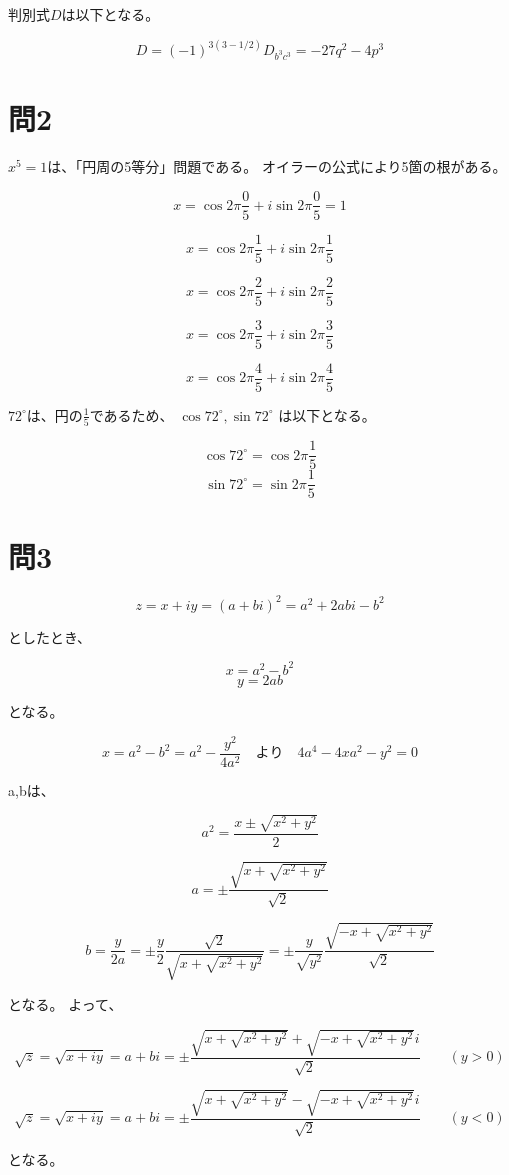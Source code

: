 \documentclass{jsarticle}
\begin{document}
判別式$D$は以下となる。

\[
  D=(-1)^{3(3-1/2)}D_{b^3c^3}=-27q^2-4p^3
\]



\section{問2}
$x^5=1$は、「円周の5等分」問題である。
オイラーの公式により5箇の根がある。

\[x = \cos 2 \pi \frac{0}{5}+i \sin 2 \pi \frac{0}{5} = 1\]

\[x = \cos 2 \pi \frac{1}{5}+i \sin 2 \pi \frac{1}{5} \]

\[x = \cos 2 \pi \frac{2}{5}+i \sin 2 \pi \frac{2}{5} \]

\[x = \cos 2 \pi \frac{3}{5}+i \sin 2 \pi \frac{3}{5} \]

\[x = \cos 2 \pi \frac{4}{5}+i \sin 2 \pi \frac{4}{5} \]

$ 72^\circ $は、円の$\frac{1}{5}$であるため、 $ \cos72^\circ, \sin72^\circ $ は以下となる。

\[ \cos72^\circ =  \cos 2 \pi \frac{1}{5} \]
\[ \sin72^\circ =   \sin 2 \pi \frac{1}{5} \]

\section{問3}

\[z = x + iy = (a + bi)^2 = a^2 + 2abi - b^2\]

としたとき、

\[x=a^2-b^2\]
\[y=2ab\]

となる。

\[x = a^2-b^2 = a^2 - \frac{y^2}{4a^2}  \quad より \quad 4a^4-4xa^2-y^2=0  \]

a,bは、

\[ a^2 = \frac{x\pm \sqrt{x^2+y^2}}{2}\]

\[ a = \pm \frac{\sqrt{x+ \sqrt{x^2+y^2}}}{\sqrt{2}}\]

\[ b = \frac{y}{2a} =
   \pm \frac{y}{2} \frac{\sqrt{2}}{\sqrt{x+\sqrt{x^2+y^2}}} =
   \pm \frac{y}{\sqrt{y^2}} \frac{\sqrt{-x+\sqrt{x^2+y^2}}}{\sqrt{2}}
  \]

となる。
よって、

\[ \sqrt{z} = \sqrt{x+iy} = a+bi =\pm \frac{\sqrt{x+ \sqrt{x^2+y^2}} + \sqrt{-x+ \sqrt{x^2+y^2}}i}
  {\sqrt{2}}  \qquad (y>0)\]


\[ \sqrt{z} = \sqrt{x+iy} = a+bi= \pm \frac{\sqrt{x+ \sqrt{x^2+y^2}} - \sqrt{-x+ \sqrt{x^2+y^2}}i}
  {\sqrt{2}}  \qquad (y < 0)\]

となる。
\end{document}
